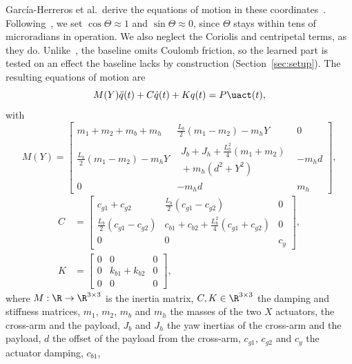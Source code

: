 Garc\'ia-Herreros et al.\ derive the equations of motion in these
coordinates~\cite[Sec.~2.2]{garcia2013model}.
Following~\cite[Sec.~2.3]{garcia2013model}, we set $\cos\Theta\approx1$ and
$\sin\Theta\approx0$, since $\Theta$ stays within tens of microradians in
operation.
We also neglect the Coriolis and centripetal terms, as they do.
Unlike~\cite[Eq.~(6)]{garcia2013model}, the baseline omits Coulomb friction, so
the learned part is tested on an effect the baseline lacks by construction
(Section~\ref{sec:setup}).
The resulting equations of motion are
\begin{equation}
  M(Y)\ddot{q}(t) + C\dot{q}(t) + K q(t) = P\uact(t),
  \label{eq:eom}
\end{equation}
with
{\footnotesize
\setlength{\arraycolsep}{3pt}
\begin{equation}
M(Y)=
\begin{bmatrix}
m_1+m_2+m_b+m_h & \tfrac{L_b}{2}(m_1-m_2)-m_hY & 0\\
\tfrac{L_b}{2}(m_1-m_2)-m_hY &
\substack{J_b+J_h+\tfrac{L_b^2}{4}(m_1+m_2)\\{}+m_h(d^2+Y^2)} & -m_hd\\
0 & -m_hd & m_h
\end{bmatrix},
\label{eq:mass_matrix}
\end{equation}
\begin{equation}
\begin{aligned}
C&=
\begin{bmatrix}
c_{g1}+c_{g2} & \tfrac{L_b}{2}(c_{g1}-c_{g2}) & 0\\
\tfrac{L_b}{2}(c_{g1}-c_{g2}) &
c_{b1}+c_{b2}+\tfrac{L_b^2}{4}(c_{g1}+c_{g2}) & 0\\
0 & 0 & c_y
\end{bmatrix},\\[1ex]
K&=
\begin{bmatrix}
0&0&0\\
0&k_{b1}+k_{b2}&0\\
0&0&0
\end{bmatrix},
\end{aligned}
\label{eq:damping_stiffness_matrices}
\end{equation}
}
where $M:\R\to\R^{3\times3}$ is the inertia matrix, $C,K\in\R^{3\times3}$ the
damping and stiffness matrices, $m_1$, $m_2$, $m_b$ and $m_h$ the masses of
the two $X$ actuators, the cross-arm and the payload, $J_b$ and $J_h$ the yaw
inertias of the cross-arm and the payload, $d$ the offset of the payload from
the cross-arm, $c_{g1}$, $c_{g2}$ and $c_y$ the actuator damping, $c_{b1}$,
